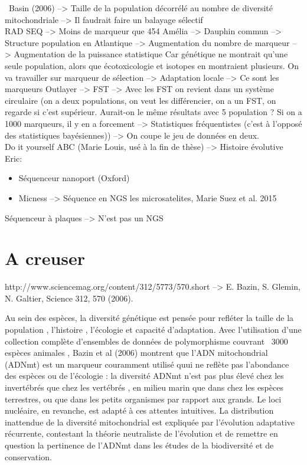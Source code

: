 \documentclass[a4paper]{article}
\begin{document}
~Basin (2006) --> Taille de la population décorrélé au nombre de diversité mitochondriale --> Il faudrait faire un balayage sélectif
~~\\
RAD SEQ --> Moins de marqueur que 454
Amélia --> Dauphin commun --> Structure population en Atlantique --> Augmentation du nombre de marqueur --> Augmentation de la puissance statistique
Car génétique ne montrait qu'une seule population, alors que écotoxicologie et isotopes en montraient plusieurs.
On va travailler sur marqueur de sélection --> Adaptation locale --> Ce sont les marqueurs Outlayer --> FST --> Avec les FST on revient dans un système circulaire (on a deux populations, on veut les différencier, on a un FST, on regarde si c'est supérieur. Aurait-on le même résultats avec 5 population ? Si on a 1000 marqueurs, il y en a forcement --> Statistiques fréquentistes (c'est à l'opposé des statistiques bayésiennes))
--> On coupe le jeu de données en deux.
~~\\
Do it yourself ABC (Marie Louis, usé à la fin de thèse)
--> Histoire évolutive
~~\\
Eric: 
\begin{itemize}
\item Séquenceur nanoport (Oxford)
\item Micness --> Séquence en NGS les microsatelites, Marie Suez et al. 2015
\end{itemize}

Séquenceur à plaques --> N'est pas un NGS

\section{A creuser}

http://www.sciencemag.org/content/312/5773/570.short --> E. Bazin, S. Glemin, N. Galtier, Science 312, 570 (2006).

Au sein des espèces, la diversité génétique est pensée pour refléter la taille de la population , l'histoire , l'écologie et capacité d'adaptation. Avec l'utilisation d'une collection complète d'ensembles de données de polymorphisme couvrant ~3000 espèces animales , Bazin et al (2006) montrent que l'ADN mitochondrial (ADNmt) est un marqueur couramment utilisé quui ne reflète pas l'abondance des espèces ou de l'écologie : la diversité ADNmt n'est pas plus élevé chez les invertébrés que chez les vertébrés , en milieu marin que dans chez les espèces terrestres, ou que dans les petits organismes par rapport aux grands. Le loci nucléaire, en revanche, est adapté à ces attentes intuitives. La distribution inattendue de la diversité mitochondrial est expliquée par l'évolution adaptative récurrente, contestant la théorie neutraliste de l'évolution et de remettre en question la pertinence de l'ADNmt dans les études de la biodiversité et de conservation.
\end{document}

